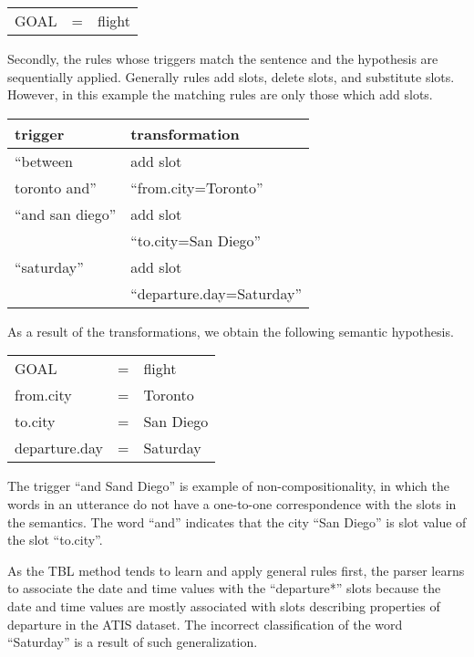 \documentclass{article}
\begin{document}
\vspace{.25cm}
\begin{tabular}{lll}
  GOAL & = & flight
\end{tabular} 
\vspace{.25cm}

Secondly, the rules whose triggers match the sentence and the hypothesis are sequentially applied. Generally rules add slots, delete slots, and substitute slots. However, in this example the matching rules are only those which add slots.

\vspace{.25cm}
\begin{tabular}{ll}
  trigger & transformation \\
  \hline 
  ``between               & add slot \\
    toronto and''         &``from.city=Toronto'' \\
  ``and san diego''       & add slot \\
                          & ``to.city=San Diego'' \\
  ``saturday''            & add slot \\
                          & ``departure.day=Saturday'' \\
\end{tabular} 
\vspace{.25cm}

As a result of the transformations, we obtain the following semantic hypothesis. 

\vspace{.25cm}
\begin{tabular}{lll}
  GOAL          & = & flight \\
  from.city     & = & Toronto \\
  to.city       & = & San Diego \\
  departure.day & = & Saturday \\
\end{tabular} 
\vspace{.25cm}

The trigger ``and Sand Diego'' is example of non-compositionality, in which the words in an utterance do not have a one-to-one correspondence with the slots in the semantics. The word ``and'' indicates that the city ``San Diego'' is slot value of the slot ``to.city''. 

As the TBL method tends to learn and apply general rules first, the parser learns to associate the date and time values with the ``departure*'' slots because the date and time values are mostly associated with slots describing properties of departure in the ATIS dataset. The incorrect classification of the word ``Saturday'' is a result of such generalization. 
\end{document}
